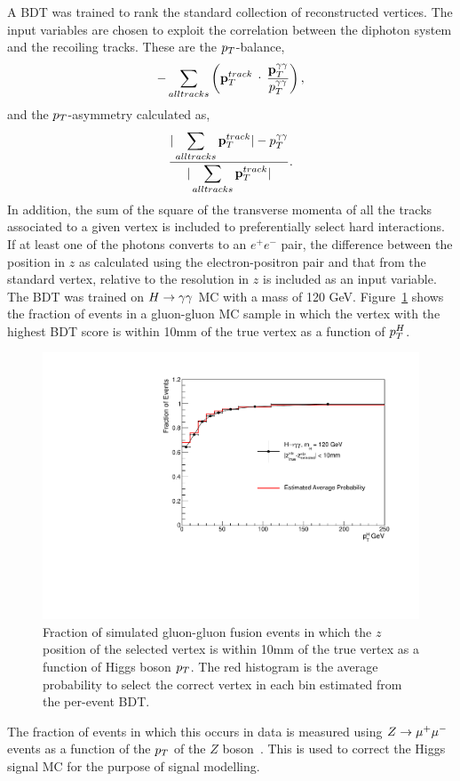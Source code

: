 A BDT was trained to rank the standard collection of reconstructed vertices.
The input variables are chosen to exploit the correlation between the diphoton system and the recoiling tracks.
These are the $p_{T}$-balance,
\begin{eqnarray}
	-\sum_{all tracks} \left(\ptvec^{track}\cdot \frac{\displaystyle \ptggvec}{\displaystyle \ptgg}\right), 
\end{eqnarray}
and the $p_{T}$-asymmetry calculated as,
\begin{eqnarray}
	\frac{\displaystyle |\sum_{all tracks} \mathbf{p}_{T}^{track}| - p_{T}^{\gamma\gamma} }{ \displaystyle|\sum_{all tracks} \mathbf{p}_{T}^{track}|}.
\end{eqnarray}
In addition, the sum of the square of the transverse momenta of all the tracks associated 
to a given vertex is included to preferentially select hard interactions. If at least one of the 
photons converts to an $e^{+}e^{-}$ pair, the difference between the position in $z$ as calculated 
using the electron-positron pair and that from the standard vertex, relative to the resolution in $z$
is included as an input variable. The BDT was trained on $H\rightarrow\gamma\gamma$ MC with a mass of 120 GeV. 
Figure~\ref{fig:vtxeffhmc} shows the fraction of events in a gluon-gluon MC sample in which 
the vertex with the highest BDT score is within 10mm of the true vertex as a function of $p_{T}^{H}$.
\begin{figure}
\includegraphics[width=.8\textwidth]{hgg7TeV/generalPlots/vtxEffHMC.pdf}
\caption{Fraction of simulated gluon-gluon fusion events in which the $z$ position of the selected vertex
is within 10mm of the true vertex as a function of Higgs boson $p_{T}$. The red histogram is the average 
probability to select the correct vertex in each bin estimated from the per-event BDT.}
\label{fig:vtxeffhmc}
\end{figure} 
The fraction of events in which this occurs in data is measured using $Z\rightarrow \mu^{+}\mu^{-}$ events
as a function of the $p_{T}$ of the $Z$ boson~\citep{AN-12-048}. This is used to correct the Higgs signal MC for 
the purpose of signal modelling. 

